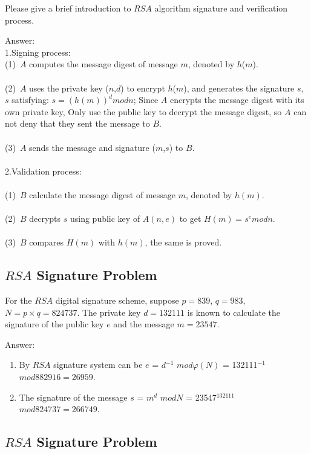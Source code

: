 \documentclass[paper=a4, fontsize=11pt]{scrartcl} %
\numberwithin{equation}{section} %
\numberwithin{figure}{section} %
\numberwithin{table}{section} %
\begin{document}
Please give a brief introduction to $RSA$ algorithm signature and verification process.

Answer:\\
\noindent 1.Signing process:\\
(1)\ $A$ computes the message digest of message $m$, denoted by $h$($m$).  \\
\\
(2)\ $A$ uses the private key ($n$,$d$) to encrypt $h$($m$), and generates the signature $s$, $s$ satisfying: $s = (h(m))^ d mod n$; Since $A$ encrypts the message digest with its own private key, Only use the public key to decrypt the message digest, so $A$ can not deny that they sent the message to $B$.  \\
\\
(3)\ $A$ sends the message and signature ($m$,$s$) to $B$.   \\
\\
\noindent 2.Validation process:\\
\\
(1)\ $B$ calculate the message digest of message $m$, denoted by $h(m)$.  \\
\\
(2)\ $B$ decrypts $s$ using public key of $A(n,e)$ to get $H(m) = s ^ e mod n$.  \\
\\
(3)\ $B$ compares $H(m)$ with $h(m)$, the same is proved.   \\


\subsection{$RSA$ Signature Problem \uppercase\expandafter{}}

For the $RSA$ digital signature scheme, suppose $p = 839$, $q = 983$, $N = p\times q = 824737$. The private key $d = 132111$ is known to calculate the signature of the public key $e$ and the message $m = 23547$.

Answer:
\begin{enumerate}
\item By $RSA$ signature system can be $e$ = $d$$^{-1}$ $mod \varphi(N)$ = 132111$^{-1}$ $mod 882916=26959$.
\item The signature of the message $s$ = $m^d$ $mod N$ = 23547$^{132111}$ $mod 824737=266749$.
\end{enumerate}


\subsection{$RSA$ Signature Problem \uppercase\expandafter{}}
\end{document}
